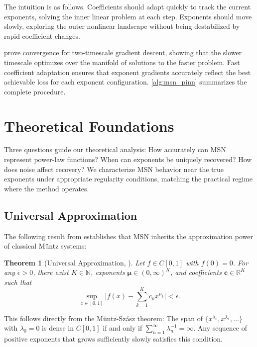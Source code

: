 \documentclass{article}
\theoremstyle{plain}
\newtheorem{theorem}{Theorem}[section]
\theoremstyle{definition}
\theoremstyle{remark}
\newcommand{\R}{\mathbb{R}}
\newcommand{\N}{\mathbb{N}}
\newcommand{\bmu}{\bm{\mu}}
\newcommand{\bc}{\bm{c}}
\begin{document}
The intuition is as follows. Coefficients should adapt quickly to track the current exponents, solving the inner linear problem at each step. Exponents should move slowly, exploring the outer nonlinear landscape without being destabilized by rapid coefficient changes.

\citet{marion2023leveraging} prove convergence for two-timescale gradient descent, showing that the slower timescale optimizes over the manifold of solutions to the faster problem. Fast coefficient adaptation ensures that exponent gradients accurately reflect the best achievable loss for each exponent configuration. \cref{alg:msn_pinn} summarizes the complete procedure.

\section{Theoretical Foundations}
\label{sec:theory}

Three questions guide our theoretical analysis: How accurately can MSN represent power-law functions? When can exponents be uniquely recovered? How does noise affect recovery? We characterize MSN behavior near the true exponents under appropriate regularity conditions, matching the practical regime where the method operates.

\subsection{Universal Approximation}

The following result from \citet{nguessan2025msn} establishes that MSN inherits the approximation power of classical M\"untz systems:
\begin{theorem}[Universal Approximation, \cite{nguessan2025msn}]
	\label{thm:universal}
	Let $f \in C[0,1]$ with $f(0) = 0$. For any $\epsilon > 0$, there exist $K \in \N$, exponents $\bmu \in (0, \infty)^K$, and coefficients $\bc \in \R^K$ such that
	\begin{equation}
		\sup_{x \in [0,1]} \lvert f(x) - \sum_{k=1}^K c_k x^{\mu_k} \rvert < \epsilon.
	\end{equation}
\end{theorem}
This follows directly from the M\"untz-Sz\'asz theorem: The span of $\{x^{\lambda_0}, x^{\lambda_1}, \ldots\}$ with $\lambda_0 = 0$ is dense in $C[0,1]$ if and only if $\sum_{n=1}^\infty \lambda_n^{-1} = \infty$. Any sequence of positive exponents that grows sufficiently slowly satisfies this condition.
\end{document}
